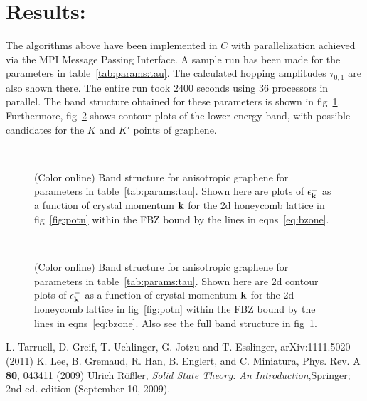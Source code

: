 \documentclass[a4paper,10pt]{article}
\begin{document}
\section{Results:}
The algorithms above have been implemented in $C$ with parallelization achieved via the MPI Message Passing Interface. A sample run has been made for the parameters in table~\ref{tab:params:tau}. The calculated hopping amplitudes $\tau_{0,1}$ are also shown there. The entire run took $2400$ seconds using $36$ processors in parallel. The band structure obtained for these parameters is shown in fig~\ref{fig:bands:3d}. Furthermore, fig~\ref{fig:lband:contour} shows contour plots of the lower energy band, with possible candidates for the $K$ and $K'$ points of graphene.
\pagebreak
\begin{figure}[h!bt]
\ 
\caption{(Color online) Band structure for anisotropic graphene for parameters in table~\ref{tab:params:tau}. Shown here are plots of $\epsilon^\pm_{\bf k}$ as a function of crystal momentum ${\bf k}$ for the 2d honeycomb lattice in fig~\ref{fig:potn} within the FBZ bound by the lines in eqns~\ref{eq:bzone}.}
\label{fig:bands:3d}
\end{figure}
\begin{figure}[h!bt]
\ 
\caption{(Color online) Band structure for anisotropic graphene for parameters in table~\ref{tab:params:tau}. Shown here are 2d contour plots of $\epsilon^-_{\bf k}$ as a function of crystal momentum ${\bf k}$ for the 2d honeycomb lattice in fig~\ref{fig:potn} within the FBZ bound by the lines in eqns~\ref{eq:bzone}. Also see the full band structure in fig~\ref{fig:bands:3d}.}
\label{fig:lband:contour}
\end{figure}
\begin{thebibliography}{99}
L. Tarruell, D. Greif, T. Uehlinger, G. Jotzu and T. Esslinger, arXiv:1111.5020 (2011)
K. Lee, B. Gremaud, R. Han, B. Englert, and C. Miniatura, Phys. Rev. A {\bf 80}, 043411 (2009)
Ulrich R\"o\ss ler, \textit{Solid State Theory: An Introduction},Springer; 2nd ed. edition (September 10, 2009).
\end{thebibliography}
\end{document}
